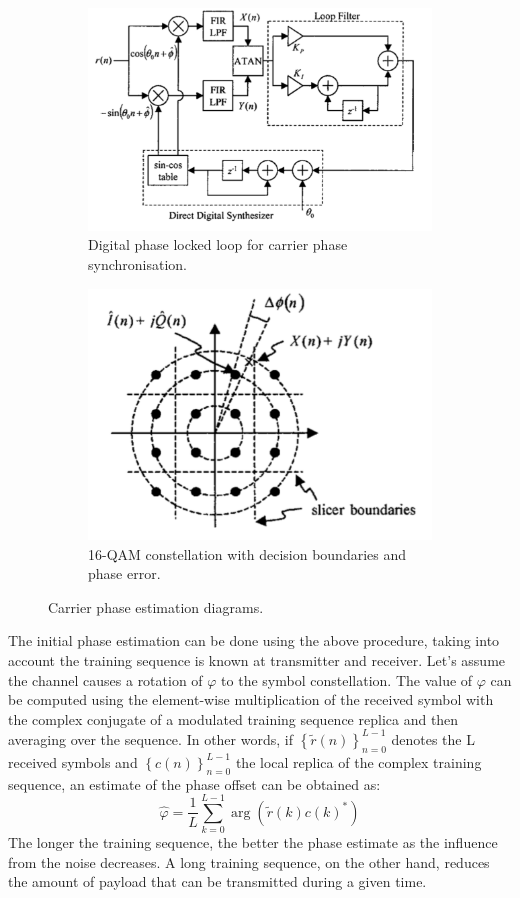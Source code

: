 \documentclass[12pt,a4paper,openright]{article}
\begin{document}
 \begin{figure}[h]
 \centering
\begin{subfigure}{0.5\textwidth}
 \centering
    \includegraphics[width=0.9\linewidth]{DPLL.pdf}
    \caption{Digital phase locked loop for carrier phase synchronisation.}
    \label{DPLL}
\end{subfigure}%
\begin{subfigure}{0.5\textwidth}
 \centering
    \includegraphics[width=0.7\linewidth]{PD.pdf}
    \caption{16-QAM constellation with decision boundaries and phase error.}
    \label{PD}
    \end{subfigure}
    \caption{Carrier phase estimation diagrams.}
    \label{carrierphase}
\end{figure}



The initial phase estimation can be done using the above procedure, taking into account the training sequence is known at transmitter and receiver. Let's assume the channel causes a rotation of $\varphi$ to the symbol constellation. The value of $\varphi$ can be computed using the element-wise multiplication of the received symbol with the complex conjugate of a modulated training sequence replica and then averaging over the sequence. In other words, if ${\left\{ {\tilde r(n)} \right\}_{n = 0}^{L - 1}}$ denotes the L received symbols and ${\left\{ {c(n)} \right\}_{n = 0}^{L - 1}}$ the local replica of the complex training sequence, an estimate of the phase offset can be obtained as:
\[\hat \varphi  = \frac{1}{L}\sum\limits_{k=0}^{L - 1} {\arg (\tilde r(k)c(k)^*)} \]
The longer the training sequence, the better the phase estimate as the influence from the noise decreases. A long training sequence, on the other hand, reduces the amount of payload that can be transmitted during a given time.
\end{document}
